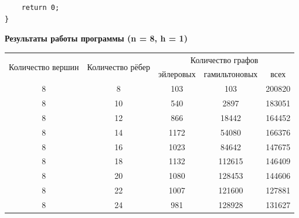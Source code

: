 \documentclass[a4paper,14pt]{extarticle}
\begin{document}
\begin{enumerate}[1.]
\begin{verbatim}
    return 0;
}
\end{verbatim}
          \begin{center}\textbf{Результаты работы программы (n = 8, h = 1)}\end{center}
          \begin{tabular}{|c|c|c|c|c|}
              \hline
              \multirow{2}{*}{Количество вершин} & \multirow{2}{*}{Количество рёбер} & \multicolumn{3}{|c|}{Количество графов}                          \\
              \cline{3-5}
                                                 &                                   & эйлеровых                               & гамильтоновых & всех   \\
              \hline
              8                                  & 8                                 & 103                                     & 103           & 200820 \\
              \hline
              8                                  & 10                                & 540                                     & 2897          & 183051 \\
              \hline
              8                                  & 12                                & 866                                     & 18442         & 164452 \\
              \hline
              8                                  & 14                                & 1172                                    & 54080         & 166376 \\
              \hline
              8                                  & 16                                & 1023                                    & 84642         & 147675 \\
              \hline
              8                                  & 18                                & 1132                                    & 112615        & 146409 \\
              \hline
              8                                  & 20                                & 1080                                    & 128453        & 144606 \\
              \hline
              8                                  & 22                                & 1007                                    & 121600        & 127881 \\
              \hline
              8                                  & 24                                & 981                                     & 128928        & 131627 \\

\end{tabular}
\end{enumerate}
\end{document}
